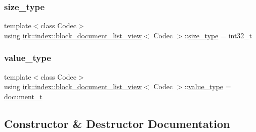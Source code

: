 \subsubsection{\texorpdfstring{size\+\_\+type}{size\_type}}
{\footnotesize\ttfamily template$<$class Codec$>$ \\
using \mbox{\hyperlink{classirk_1_1index_1_1block__document__list__view}{irk\+::index\+::block\+\_\+document\+\_\+list\+\_\+view}}$<$ Codec $>$\+::\mbox{\hyperlink{classirk_1_1index_1_1block__document__list__view_abc1e76d262386112c4591362fc660dda}{size\+\_\+type}} =  int32\+\_\+t}

\mbox{\label{classirk_1_1index_1_1block__document__list__view_a06e2f36c5850de123fefa071ae56da92}} 
\subsubsection{\texorpdfstring{value\+\_\+type}{value\_type}}
{\footnotesize\ttfamily template$<$class Codec$>$ \\
using \mbox{\hyperlink{classirk_1_1index_1_1block__document__list__view}{irk\+::index\+::block\+\_\+document\+\_\+list\+\_\+view}}$<$ Codec $>$\+::\mbox{\hyperlink{classirk_1_1index_1_1block__document__list__view_a06e2f36c5850de123fefa071ae56da92}{value\+\_\+type}} =  \mbox{\hyperlink{namespaceirk_1_1index_af829dedea20da89f9b51b49d78f57006}{document\+\_\+t}}}



\subsection{Constructor \& Destructor Documentation}
\mbox{\label{classirk_1_1index_1_1block__document__list__view_a9664030e51525833bbe188c0ffaf763e}} 
